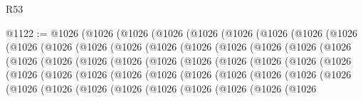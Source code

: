 \begin{lexlean}{R53}
\begin{coremodule}
@1122 := @1026
    (@1026
      (@1026
        (@1026
          (@1026
            (@1026
              (@1026
                (@1026
                  (@1026
                    (@1026
                      (@1026
                        (@1026
                          (@1026
                            (@1026
                              (@1026
                                (@1026
                                  (@1026
                                    (@1026
                                      (@1026
                                        (@1026
                                          (@1026
                                            (@1026
                                              (@1026
                                                (@1026
                                                  (@1026
                                                    (@1026
                                                      (@1026
                                                        (@1026
                                                          (@1026
                                                            (@1026
                                                              (@1026
                                                                (@1026
                                                                  (@1026
                                                                    (@1026
                                                                      (@1026
                                                                        (@1026
                                                                          (@1026
                                                                            (@1026
                                                                              (@1026
                                                                                (@1026
                                                                                  (@1026
                                                                                    (@1026
                                                                                      (@1026
                                                                                        (@1026
                                                                                          (@1026
                                                                                            (@1026
                                                                                              (@1026
                                                                                                (@1026

\end{coremodule}
\end{lexlean}
